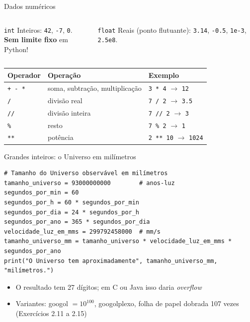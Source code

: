 \documentclass[aspectratio=169,10pt,t]{beamer}
\begin{document}
\begin{frame}{Dados numéricos}
  \begin{columns}[T]
    \begin{block}{\texttt{int}}
      Inteiros: \texttt{42}, \texttt{-7}, \texttt{0}.\\
      \textbf{Sem limite fixo} em Python!
    \end{block}
    \begin{block}{\texttt{float}}
      Reais (ponto flutuante): \texttt{3.14}, \texttt{-0.5}, \texttt{1e-3}, \texttt{2.5e8}.
    \end{block}
  \end{columns}
  \vspace{1ex}
  \centering\small
  \begin{tabular}{lll}
    \toprule
    Operador & Operação & Exemplo\\
    \midrule
    \texttt{+ - *} & soma, subtração, multiplicação & \texttt{3 * 4} \(\to\) \texttt{12}\\
    \texttt{/} & divisão real & \texttt{7 / 2} \(\to\) \texttt{3.5}\\
    \texttt{//} & divisão inteira & \texttt{7 // 2} \(\to\) \texttt{3}\\
    \texttt{\%} & resto & \texttt{7 \% 2} \(\to\) \texttt{1}\\
    \texttt{**} & potência & \texttt{2 ** 10} \(\to\) \texttt{1024}\\
    \bottomrule
  \end{tabular}
\end{frame}

\begin{frame}[fragile]{Grandes inteiros: o Universo em milímetros}
\begin{lstlisting}
# Tamanho do Universo observável em milímetros
tamanho_universo = 93000000000        # anos-luz
segundos_por_min = 60
segundos_por_h = 60 * segundos_por_min
segundos_por_dia = 24 * segundos_por_h
segundos_por_ano = 365 * segundos_por_dia
velocidade_luz_em_mms = 299792458000  # mm/s
tamanho_universo_mm = tamanho_universo * velocidade_luz_em_mms * segundos_por_ano
print("O Universo tem aproximadamente", tamanho_universo_mm, "milímetros.")
\end{lstlisting}
  \begin{itemize}
    \item O resultado tem 27 dígitos; em C ou Java isso daria \emph{overflow}
    \item Variantes: googol \(=10^{100}\), googolplexo, folha de papel dobrada 107 vezes (Exercícios 2.11 a 2.15)
  \end{itemize}
\end{frame}
\end{document}
